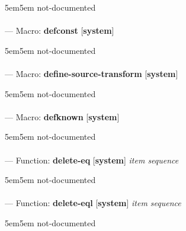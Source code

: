 \begin{adjustwidth}{5em}{5em}
not-documented
\end{adjustwidth}

\paragraph{}
\label{SYSTEM:DEFCONST}
--- Macro: \textbf{defconst} [\textbf{system}] \textit{}

\begin{adjustwidth}{5em}{5em}
not-documented
\end{adjustwidth}

\paragraph{}
\label{SYSTEM:DEFINE-SOURCE-TRANSFORM}
--- Macro: \textbf{define-source-transform} [\textbf{system}] \textit{}

\begin{adjustwidth}{5em}{5em}
not-documented
\end{adjustwidth}

\paragraph{}
\label{SYSTEM:DEFKNOWN}
--- Macro: \textbf{defknown} [\textbf{system}] \textit{}

\begin{adjustwidth}{5em}{5em}
not-documented
\end{adjustwidth}

\paragraph{}
\label{SYSTEM:DELETE-EQ}
--- Function: \textbf{delete-eq} [\textbf{system}] \textit{item sequence}

\begin{adjustwidth}{5em}{5em}
not-documented
\end{adjustwidth}

\paragraph{}
\label{SYSTEM:DELETE-EQL}
--- Function: \textbf{delete-eql} [\textbf{system}] \textit{item sequence}

\begin{adjustwidth}{5em}{5em}
not-documented
\end{adjustwidth}


